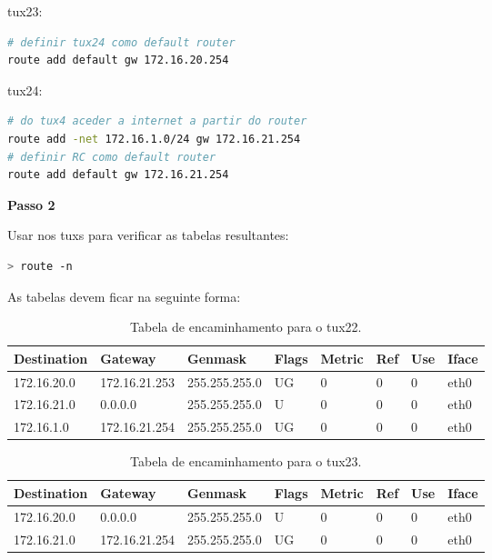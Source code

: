tux23:
\begin{lstlisting}[language=bash]
# definir tux24 como default router
route add default gw 172.16.20.254
\end{lstlisting}

tux24:
\begin{lstlisting}[language=bash]
# do tux4 aceder a internet a partir do router
route add -net 172.16.1.0/24 gw 172.16.21.254
# definir RC como default router
route add default gw 172.16.21.254
\end{lstlisting}


\textbf{Passo 2}

Usar nos tuxs para verificar as tabelas resultantes:
\begin{lstlisting}[language=bash]
> route -n
\end{lstlisting}

\clearpage
As tabelas devem ficar na seguinte forma:

\begin{table}[h]
    \centering
    \begin{tabular}{|l|l|l|l|l|l|l|l|}
    \hline
        Destination & Gateway & Genmask & Flags & Metric & Ref & Use & Iface \\ \hline
        172.16.20.0 & 172.16.21.253 & 255.255.255.0 & UG & 0 & 0 & 0 & eth0 \\ \hline
        172.16.21.0 & 0.0.0.0 & 255.255.255.0 & U & 0 & 0 & 0 & eth0 \\ \hline
        172.16.1.0 & 172.16.21.254 & 255.255.255.0 & UG & 0 & 0 & 0 & eth0 \\ \hline
    \end{tabular}
    \caption{\label{tab:table-name}Tabela de encaminhamento para o tux22.}
\end{table}

\begin{table}[h]
    \centering
    \begin{tabular}{|l|l|l|l|l|l|l|l|}
    \hline
        Destination & Gateway & Genmask & Flags & Metric & Ref & Use & Iface \\ \hline
        172.16.20.0 & 0.0.0.0 & 255.255.255.0 & U & 0 & 0 & 0 & eth0 \\ \hline
        172.16.21.0 & 172.16.21.254 & 255.255.255.0 & UG & 0 & 0 & 0 & eth0 \\ \hline
    \end{tabular}
    \caption{\label{tab:table-name}Tabela de encaminhamento para o tux23.}
\end{table}

